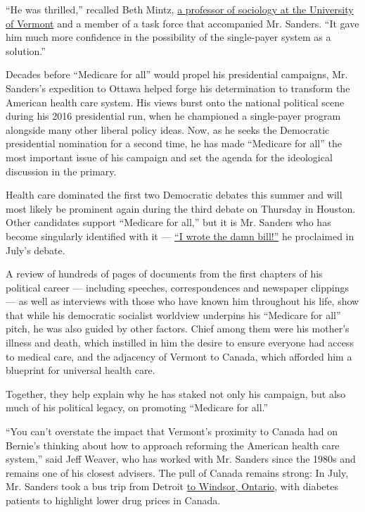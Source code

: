 ``He was thrilled,'' recalled Beth Mintz,
\href{https://www.uvm.edu/cas/sociology/profiles/beth-mintz}{a professor
of sociology at the University of Vermont} and a member of a task force
that accompanied Mr. Sanders. ``It gave him much more confidence in the
possibility of the single-payer system as a solution.''

Decades before ``Medicare for all'' would propel his presidential
campaigns, Mr. Sanders's expedition to Ottawa helped forge his
determination to transform the American health care system. His views
burst onto the national political scene during his 2016 presidential
run, when he championed a single-payer program alongside many other
liberal policy ideas. Now, as he seeks the Democratic presidential
nomination for a second time, he has made ``Medicare for all'' the most
important issue of his campaign and set the agenda for the ideological
discussion in the primary.

Health care dominated the first two Democratic debates this summer and
will most likely be prominent again during the third debate on Thursday
in Houston. Other candidates support ``Medicare for all,'' but it is Mr.
Sanders who has become singularly identified with it ---
\href{https://www.nytimes3xbfgragh.onion/2019/07/30/us/politics/bernie-sanders-debate.html}{``I
wrote the damn bill!''} he proclaimed in July's debate.

A review of hundreds of pages of documents from the first chapters of
his political career --- including speeches, correspondences and
newspaper clippings --- as well as interviews with those who have known
him throughout his life, show that while his democratic socialist
worldview underpins his ``Medicare for all'' pitch, he was also guided
by other factors. Chief among them were his mother's illness and death,
which instilled in him the desire to ensure everyone had access to
medical care, and the adjacency of Vermont to Canada, which afforded him
a blueprint for universal health care.

Together, they help explain why he has staked not only his campaign, but
also much of his political legacy, on promoting ``Medicare for all.''

``You can't overstate the impact that Vermont's proximity to Canada had
on Bernie's thinking about how to approach reforming the American health
care system,'' said Jeff Weaver, who has worked with Mr. Sanders since
the 1980s and remains one of his closest advisers. The pull of Canada
remains strong: In July, Mr. Sanders took a bus trip from Detroit
\href{https://www.nytimes3xbfgragh.onion/2019/07/28/us/politics/bernie-sanders-prescription-drug-prices.html}{to
Windsor, Ontario}, with diabetes patients to highlight lower drug prices
in Canada.

